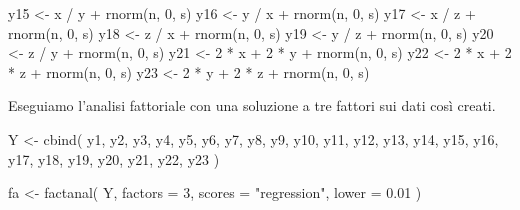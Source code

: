 \documentclass[
  11pt,
]{krantz}
\makeatletter
\newenvironment{Shaded}{\begin{snugshade}}{\end{snugshade}}
\newcommand{\AttributeTok}[1]{\textcolor[rgb]{0.61,0.61,0.61}{#1}}
\newcommand{\DecValTok}[1]{\textcolor[rgb]{0.06,0.06,0.06}{#1}}
\newcommand{\FloatTok}[1]{\textcolor[rgb]{0.06,0.06,0.06}{#1}}
\newcommand{\FunctionTok}[1]{\textcolor[rgb]{0,0,0}{#1}}
\newcommand{\NormalTok}[1]{#1}
\newcommand{\OtherTok}[1]{\textcolor[rgb]{0.37,0.37,0.37}{#1}}
\newcommand{\SpecialCharTok}[1]{\textcolor[rgb]{0,0,0}{#1}}
\newcommand{\StringTok}[1]{\textcolor[rgb]{0.5,0.5,0.5}{#1}}
\newenvironment{kframe}{%
\medskip{}
\setlength{\fboxsep}{.8em}
 \def\at@end@of@kframe{}%
 \ifinner\ifhmode%
  \def\at@end@of@kframe{\end{minipage}}%
  \begin{minipage}{\columnwidth}%
 \fi\fi%
 \def\FrameCommand##1{\hskip\@totalleftmargin \hskip-\fboxsep
 \colorbox{shadecolor}{##1}\hskip-\fboxsep
     \hskip-\linewidth \hskip-\@totalleftmargin \hskip\columnwidth}%
 \MakeFramed {\advance\hsize-\width
   \@totalleftmargin\z@ \linewidth\hsize
   \@setminipage}}%
 {\par\unskip\endMakeFramed%
 \at@end@of@kframe}
\renewenvironment{Shaded}{\begin{kframe}}{\end{kframe}}
\makeatother
\begin{document}
\begin{Shaded}
\begin{Highlighting}[]
\NormalTok{y15 }\OtherTok{\textless{}{-}}\NormalTok{ x }\SpecialCharTok{/}\NormalTok{ y }\SpecialCharTok{+} \FunctionTok{rnorm}\NormalTok{(n, }\DecValTok{0}\NormalTok{, s)}
\NormalTok{y16 }\OtherTok{\textless{}{-}}\NormalTok{ y }\SpecialCharTok{/}\NormalTok{ x }\SpecialCharTok{+} \FunctionTok{rnorm}\NormalTok{(n, }\DecValTok{0}\NormalTok{, s)}
\NormalTok{y17 }\OtherTok{\textless{}{-}}\NormalTok{ x }\SpecialCharTok{/}\NormalTok{ z }\SpecialCharTok{+} \FunctionTok{rnorm}\NormalTok{(n, }\DecValTok{0}\NormalTok{, s)}
\NormalTok{y18 }\OtherTok{\textless{}{-}}\NormalTok{ z }\SpecialCharTok{/}\NormalTok{ x }\SpecialCharTok{+} \FunctionTok{rnorm}\NormalTok{(n, }\DecValTok{0}\NormalTok{, s)}
\NormalTok{y19 }\OtherTok{\textless{}{-}}\NormalTok{ y }\SpecialCharTok{/}\NormalTok{ z }\SpecialCharTok{+} \FunctionTok{rnorm}\NormalTok{(n, }\DecValTok{0}\NormalTok{, s)}
\NormalTok{y20 }\OtherTok{\textless{}{-}}\NormalTok{ z }\SpecialCharTok{/}\NormalTok{ y }\SpecialCharTok{+} \FunctionTok{rnorm}\NormalTok{(n, }\DecValTok{0}\NormalTok{, s)}
\NormalTok{y21 }\OtherTok{\textless{}{-}} \DecValTok{2} \SpecialCharTok{*}\NormalTok{ x }\SpecialCharTok{+} \DecValTok{2} \SpecialCharTok{*}\NormalTok{ y }\SpecialCharTok{+} \FunctionTok{rnorm}\NormalTok{(n, }\DecValTok{0}\NormalTok{, s)}
\NormalTok{y22 }\OtherTok{\textless{}{-}} \DecValTok{2} \SpecialCharTok{*}\NormalTok{ x }\SpecialCharTok{+} \DecValTok{2} \SpecialCharTok{*}\NormalTok{ z }\SpecialCharTok{+} \FunctionTok{rnorm}\NormalTok{(n, }\DecValTok{0}\NormalTok{, s)}
\NormalTok{y23 }\OtherTok{\textless{}{-}} \DecValTok{2} \SpecialCharTok{*}\NormalTok{ y }\SpecialCharTok{+} \DecValTok{2} \SpecialCharTok{*}\NormalTok{ z }\SpecialCharTok{+} \FunctionTok{rnorm}\NormalTok{(n, }\DecValTok{0}\NormalTok{, s)}
\end{Highlighting}
\end{Shaded}

Eseguiamo l'analisi fattoriale con una soluzione a tre fattori sui dati così creati.

\begin{Shaded}
\begin{Highlighting}[]
\NormalTok{Y }\OtherTok{\textless{}{-}} \FunctionTok{cbind}\NormalTok{(}
\NormalTok{  y1, y2, y3, y4, y5, y6, y7, y8, y9,}
\NormalTok{  y10, y11, y12, y13, y14, y15, y16,}
\NormalTok{  y17, y18, y19, y20, y21, y22, y23}
\NormalTok{)}

\NormalTok{fa }\OtherTok{\textless{}{-}} \FunctionTok{factanal}\NormalTok{(}
\NormalTok{  Y,}
  \AttributeTok{factors =} \DecValTok{3}\NormalTok{,}
  \AttributeTok{scores =} \StringTok{"regression"}\NormalTok{,}
  \AttributeTok{lower =} \FloatTok{0.01}
\NormalTok{)}
\end{Highlighting}
\end{Shaded}
\end{document}
